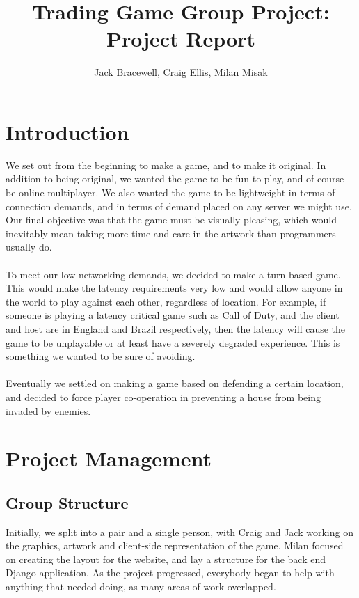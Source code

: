 \documentclass{article}
\begin{document}
\title{Trading Game Group Project: Project Report}
\author{Jack Bracewell, Craig Ellis, Milan Misak}
\date{}

\maketitle
\vspace{1.5cm}
\tableofcontents
\clearpage

\section{Introduction}
We set out from the beginning to make a game, and to make it original. In addition to being original, we wanted the game to be fun to play, and of course be online multiplayer. We also wanted the game to be lightweight in terms of connection demands, and in terms of demand placed on any server we might use. Our final objective was that the game must be visually pleasing, which would inevitably mean taking more time and care in the artwork than programmers usually do. \\ \\
To meet our low networking demands, we decided to make a turn based game. This would make the latency requirements very low and would allow anyone in the world to play against each other, regardless of location. For example, if someone is playing a latency critical game such as Call of Duty, and the client and host are in England and Brazil respectively, then the latency will cause the game to be unplayable or at least have a severely degraded experience. This is something we wanted to be sure of avoiding. \\ \\
Eventually we settled on making a game based on defending a certain location, and decided to force player co-operation in preventing a house from being invaded by enemies. 


\section{Project Management}

\subsection{Group Structure}
Initially, we split into a pair and a single person, with Craig and Jack working on the graphics, artwork and client-side representation of the game. Milan focused on creating the layout for the website, and lay a structure for the back end Django application. As the project progressed, everybody began to help with anything that needed doing, as many areas of work overlapped.
\end{document}
